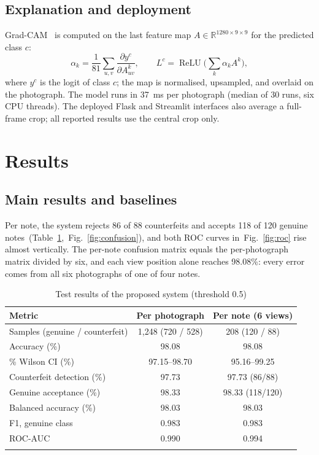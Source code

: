 \documentclass[pdflatex,iicol,sn-mathphys-num]{sn-jnl}
\begin{document}
\subsection{Explanation and deployment}\label{sec:deploy}

Grad-CAM~\cite{selvaraju2017gradcam} is computed on the last feature map
$A\in\mathbb{R}^{1280\times9\times9}$ for the predicted class $c$:
\begin{equation}
\alpha_k = \frac{1}{81}\sum_{u,v}\frac{\partial y^{c}}{\partial A^{k}_{uv}},\qquad
L^{c} = \operatorname{ReLU}\!\Big(\sum_{k}\alpha_k A^{k}\Big),
\label{eq:gradcam}
\end{equation}
where $y^c$ is the logit of class $c$; the map is normalised, upsampled, and overlaid on
the photograph. The model runs in 37~ms per photograph (median of 30 runs, six CPU
threads). The deployed Flask and Streamlit interfaces also average a full-frame crop;
all reported results use the central crop only.

\section{Results}\label{sec:results}

\subsection{Main results and baselines}\label{sec:main}

Per note, the system rejects 86 of 88 counterfeits and accepts 118 of 120 genuine notes~(Table~\ref{tab:main},~Fig.~\ref{fig:confusion}), and both ROC curves in~Fig.~\ref{fig:roc} rise almost vertically. The per-note confusion matrix equals the
per-photograph matrix divided by six, and each view position alone reaches 98.08\%:
every error comes from all six photographs of one of four notes.

\begin{table}[!t]
\caption{Test results of the proposed system (threshold 0.5)}\label{tab:main}
\begin{tabular*}{\textwidth}{@{\extracolsep\fill}lcc}
\toprule
Metric & Per photograph & Per note (6 views) \\
\midrule
Samples (genuine / counterfeit) & 1{,}248 (720 / 528) & 208 (120 / 88) \\
Accuracy (\%) & 98.08 & 98.08 \\
\quad 95\% Wilson CI (\%) & 97.15--98.70 & 95.16--99.25 \\
Counterfeit detection (\%) & 97.73 & 97.73 (86/88) \\
Genuine acceptance (\%) & 98.33 & 98.33 (118/120) \\
Balanced accuracy (\%) & 98.03 & 98.03 \\
F1, genuine class & 0.983 & 0.983 \\
ROC-AUC & 0.990 & 0.994 \\
\botrule
\end{tabular*}
\end{table}
\end{document}
